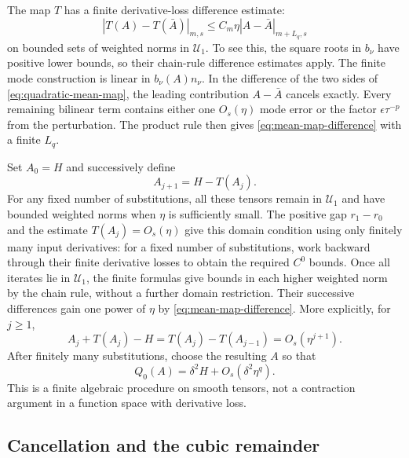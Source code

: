 The map $T$ has a finite derivative-loss difference estimate:
\begin{equation}\label{eq:mean-map-difference}
 |T(A)-T(\bar A)|_{m,s}
 \leq C_m\eta|A-\bar A|_{m+L_q,s}
\end{equation}
on bounded sets of weighted norms in $\mathcal U_1$. To see
this, the square roots in $b_\nu$ have positive lower bounds, so their
chain-rule difference estimates apply. The finite mode construction is linear
in $b_\nu(A)n_\nu$. In the difference of the two sides of
\eqref{eq:quadratic-mean-map}, the leading contribution $A-\bar A$ cancels
exactly. Every remaining bilinear term contains either one $O_s(\eta)$ mode
error or the factor $\epsilon\tau^{-p}$ from the perturbation. The product
rule then gives \eqref{eq:mean-map-difference} with a finite $L_q$.

Set $A_0=H$ and successively define
\[
 A_{j+1}=H-T(A_j).
\]
For any fixed number of substitutions, all these tensors remain in
$\mathcal U_1$ and have bounded weighted norms when $\eta$ is sufficiently
small.  The positive gap $r_1-r_0$ and the estimate $T(A_j)=O_s(\eta)$
give this domain condition using only finitely many input derivatives:
for a fixed number of substitutions, work backward through their finite
derivative losses to obtain the required $C^0$ bounds.  Once all iterates
lie in $\mathcal U_1$, the finite formulas give bounds in each higher
weighted norm by the chain rule, without a further domain restriction.
Their successive
differences gain one power of $\eta$ by
\eqref{eq:mean-map-difference}. More explicitly, for $j\geq1$,
\[
 A_j+T(A_j)-H=T(A_j)-T(A_{j-1})=O_s(\eta^{j+1}).
\]
After finitely many substitutions, choose the resulting $A$ so that
\begin{equation}\label{eq:adjusted-quadratic-mean}
 Q_0(A)=\delta^2H+O_s(\delta^2\eta^q).
\end{equation}
This is a finite algebraic procedure on smooth tensors, not a contraction
argument in a function space with derivative loss.

\subsection{Cancellation and the cubic remainder}

